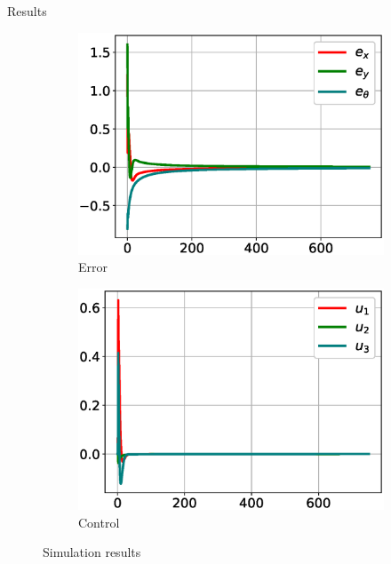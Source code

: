 \documentclass[10pt, xcolor={usenames, dvipsnames}]{beamer}
\begin{document}
\begin{frame}{Results}
\begin{minipage}{.65\textwidth}
\begin{figure}
\begin{subfigure}{.48\textwidth}
                    \end{subfigure}
                    \begin{subfigure}{.48\textwidth}
                        \centering
                        \includegraphics[width=\textwidth]{imgs/error}
                        \caption{Error}
                    \end{subfigure}
                    \begin{subfigure}{.48\textwidth}
                        \centering
                        \includegraphics[width=\textwidth]{imgs/control}
                        \caption{Control}
                    \end{subfigure}
                    \caption{Simulation results}
                \end{figure}
            \end{minipage}
        \end{frame}
\end{document}
